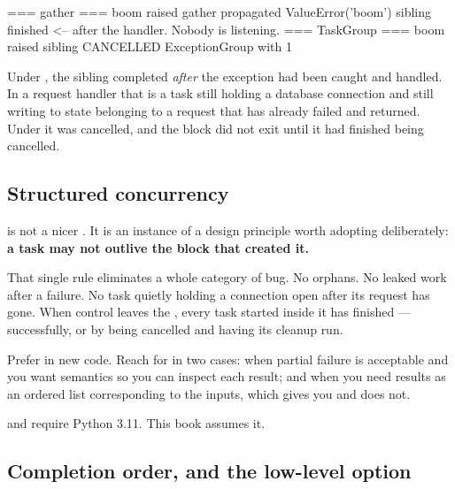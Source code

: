 \begin{console}
=== gather ===
   boom raised
   gather propagated ValueError('boom')
   sibling finished          <-- after the handler. Nobody is listening.
=== TaskGroup ===
   boom raised
   sibling CANCELLED
   ExceptionGroup with 1
\end{console}

Under , the sibling completed \emph{after} the exception had been
caught and handled. In a request handler that is a task still holding a database
connection and still writing to state belonging to a request that has already
failed and returned. Under  it was cancelled, and the block did
not exit until it had finished being cancelled.


\subsection{Structured concurrency}
\label{sec:structured-concurrency}

 is not a nicer . It is an instance of a design
principle worth adopting deliberately: \textbf{a task may not outlive the block
that created it.}

That single rule eliminates a whole category of bug. No orphans. No leaked work
after a failure. No task quietly holding a connection open after its request has
gone. When control leaves the , every task started inside it has
finished --- successfully, or by being cancelled and having its cleanup run.

\begin{note}
Prefer  in new code. Reach for  in two cases: when
partial failure is acceptable and you want  semantics so
you can inspect each result; and when you need results as an ordered list
corresponding to the inputs, which  gives you and 
does not.

 and  require Python 3.11. This book assumes it.
\end{note}

\subsection{Completion order, and the low-level option}
\label{sec:as-completed}

